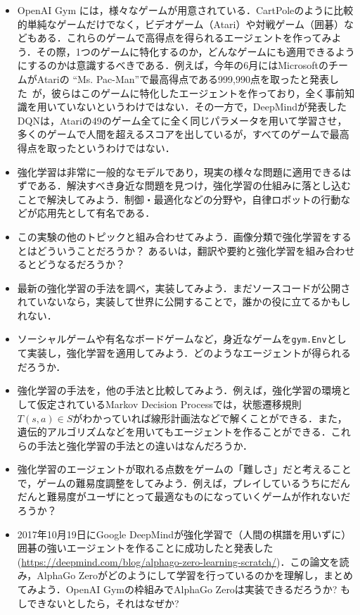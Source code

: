   \begin{itemize}
   \item OpenAI Gym には，様々なゲームが用意されている．CartPoleのように比較的単純なゲームだけでなく，ビデオゲーム（Atari）や対戦ゲーム（囲碁）などもある．これらのゲームで高得点を得られるエージェントを作ってみよう．その際，1つのゲームに特化するのか，どんなゲームにも適用できるようにするのかは意識するべきである．例えば，今年の6月にはMicrosoftのチームがAtariの ``Ms. Pac-Man''で最高得点である999,990点を取ったと発表した~\cite{allison2017pacman}が，彼らはこのゲームに特化したエージェントを作っており，全く事前知識を用いていないというわけではない．その一方で，DeepMindが発表したDQNは，Atariの49のゲーム全てに全く同じパラメータを用いて学習させ，多くのゲームで人間を超えるスコアを出しているが，すべてのゲームで最高得点を取ったというわけではない．
   \item 強化学習は非常に一般的なモデルであり，現実の様々な問題に適用できるはずである．解決すべき身近な問題を見つけ，強化学習の仕組みに落とし込むことで解決してみよう．制御・最適化などの分野や，自律ロボットの行動などが応用先として有名である．
   \item この実験の他のトピックと組み合わせてみよう．画像分類で強化学習をするとはどういうことだろうか？ あるいは，翻訳や要約と強化学習を組み合わせるとどうなるだろうか？
   \item 最新の強化学習の手法を調べ，実装してみよう．まだソースコードが公開されていないなら，実装して世界に公開することで，誰かの役に立てるかもしれない．
   \item ソーシャルゲームや有名なボードゲームなど，身近なゲームを\verb+gym.Env+として実装し，強化学習を適用してみよう．どのようなエージェントが得られるだろうか．
   \item 強化学習の手法を，他の手法と比較してみよう．例えば，強化学習の環境として仮定されているMarkov Decision Processでは，状態遷移規則$T(s, a)\in S$がわかっていれば線形計画法などで解くことができる．また，遺伝的アルゴリズムなどを用いてもエージェントを作ることができる．これらの手法と強化学習の手法との違いはなんだろうか．
   \item 強化学習のエージェントが取れる点数をゲームの「難しさ」だと考えることで，ゲームの難易度調整をしてみよう．例えば，プレイしているうちにだんだんと難易度がユーザにとって最適なものになっていくゲームが作れないだろうか？
   \item 2017年10月19日にGoogle DeepMindが強化学習で（人間の棋譜を用いずに）囲碁の強いエージェントを作ることに成功したと発表した (\url{https://deepmind.com/blog/alphago-zero-learning-scratch/})．この論文を読み，AlphaGo Zeroがどのようにして学習を行っているのかを理解し，まとめてみよう．OpenAI Gymの枠組みでAlphaGo Zeroは実装できるだろうか? もしできないとしたら，それはなぜか?
  \end{itemize}
